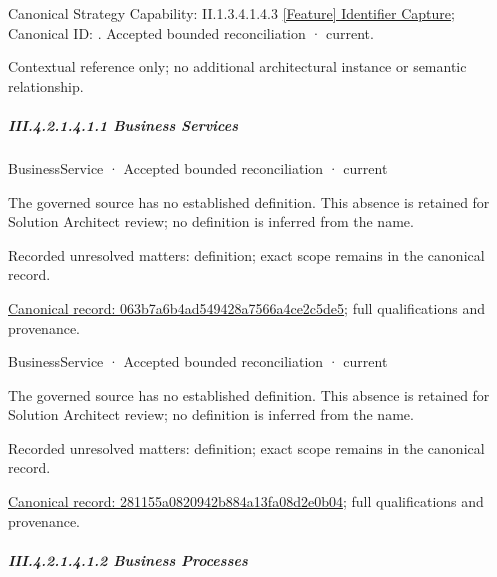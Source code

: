 {\small Canonical Strategy Capability: II.1.3.4.1.4.3 \hyperref[element:3cae3c4810974c5f8ee5a4c942f38b07]{[Feature] Identifier Capture}; Canonical ID: \texttt{}. Accepted bounded reconciliation · current.}\par
Contextual reference only; no additional architectural instance or semantic relationship.\par
\subparagraph*{III.4.2.1.4.1.1 Business Services}
\label{navigation:III.4.2.1.4.1.1}

\label{navigation:III.4.2.1.4.1.1.1}

\label{element:063b7a6b4ad549428a7566a4ce2c5de5}
{\small BusinessService · Accepted bounded reconciliation · current}\par

The governed source has no established definition. This absence is retained for Solution Architect review; no definition is inferred from the name.


{\small Recorded unresolved matters: definition; exact scope remains in the canonical record.}\par
{\footnotesize \href{../../../../../../../continuum/business/business-service/063b7a6b4ad549428a7566a4ce2c5de5.md}{Canonical record: 063b7a6b4ad549428a7566a4ce2c5de5}; full qualifications and provenance.}\par
{}
\label{navigation:III.4.2.1.4.1.1.2}

\label{element:281155a0820942b884a13fa08d2e0b04}
{\small BusinessService · Accepted bounded reconciliation · current}\par

The governed source has no established definition. This absence is retained for Solution Architect review; no definition is inferred from the name.


{\small Recorded unresolved matters: definition; exact scope remains in the canonical record.}\par
{\footnotesize \href{../../../../../../../continuum/business/business-service/281155a0820942b884a13fa08d2e0b04.md}{Canonical record: 281155a0820942b884a13fa08d2e0b04}; full qualifications and provenance.}\par
\subparagraph*{III.4.2.1.4.1.2 Business Processes}
\label{navigation:III.4.2.1.4.1.2}

